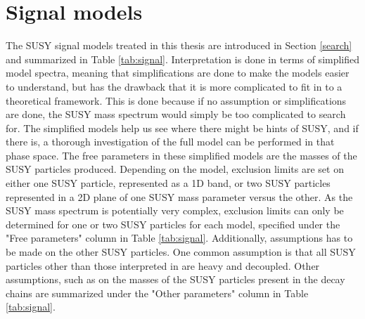 \section{Signal models}
\noindent
\justify
The SUSY signal models treated in this thesis are introduced in Section \ref{search} and summarized in Table \ref{tab:signal}. 
Interpretation is done in terms of simplified model spectra, meaning that simplifications are done to make the models easier to understand, but has the drawback that it is more complicated to fit in to a theoretical framework.
This is done because if no assumption or simplifications are done, the SUSY mass spectrum would simply be too complicated to search for. 
The simplified models help us see where there might be hints of SUSY, and if there is, a thorough investigation of the full model can be performed in that phase space. 
The free parameters in these simplified models are the masses of the SUSY particles produced.
Depending on the model, exclusion limits are set on either one SUSY particle, represented as a 1D band, or two SUSY particles represented in a 2D plane of one SUSY mass parameter versus the other. 
As the SUSY mass spectrum is potentially very complex, exclusion limits can only be determined for one or two SUSY particles for each model, specified under the "Free parameters" column in Table \ref{tab:signal}. 
Additionally, assumptions has to be made on the other SUSY particles.
One common assumption is that all SUSY particles other than those interpreted in are heavy and decoupled. 
Other assumptions, such as on the masses of the SUSY particles present in the decay chains are summarized under the "Other parameters" column in Table \ref{tab:signal}.  
